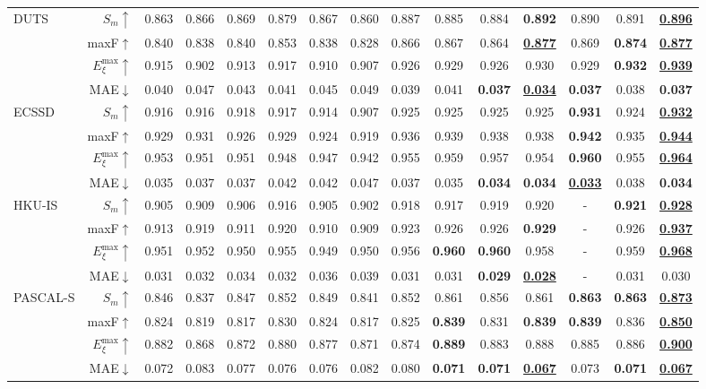 \documentclass[10pt,twocolumn,letterpaper]{article}
\def\blu#1{\textbf{\color{blue} #1}} \def\red#1{\textbf{\color{red}\underline{#1}}}
\begin{document}
\begin{table*}[t]
\begin{tabular}{lr|cccccccccccc|c}
  \multirow{4}{*}{DUTS}
    & $S_m\uparrow$  &0.863 &0.866 &0.869 &0.879 &0.867 &0.860 &0.887 &0.885 &0.884 &\blu{0.892} &0.890 &0.891 &\red{0.896} \\
    & maxF$\uparrow$ &0.840 &0.838 &0.840 &0.853 &0.838 &0.828 &0.866 &0.867 &0.864 &\red{0.877} &0.869 &\blu{0.874} &\red{0.877}\\
    & $E_{\xi}^{\text{max}}\uparrow$ &0.915 &0.902 &0.913 &0.917 &0.910 &0.907 &0.926 &0.929 &0.926 &0.930 &0.929 &\blu{0.932} &\red{0.939}\\
  \cite{wang2017duts}& MAE$\downarrow$ &0.040 &0.047 &0.043 &0.041 &0.045 &0.049 &0.039 &0.041 &\blu{0.037} &\red{0.034} &\blu{0.037} &0.038 &\blu{0.037}\\
     \hline
  \multirow{4}{*}{ECSSD}
    & $S_m\uparrow$   &0.916 &0.916 &0.918 &0.917 &0.914 &0.907 &0.925 &0.925 &0.925 &0.925 &\blu{0.931} &0.924 &\red{0.932}\\
    & maxF$\uparrow$  &0.929 &0.931 &0.926 &0.929 &0.924 &0.919 &0.936 &0.939 &0.938 &0.938 &\blu{0.942} &0.935 &\red{0.944}\\
    & $E_{\xi}^{\text{max}}\uparrow$ &0.953 &0.951 &0.951 &0.948 &0.947 &0.942 &0.955 &0.959 &0.957 &0.954 &\blu{0.960} &0.955 &\red{0.964} \\
   \cite{yan2013ECSSD}& MAE$\downarrow$ &0.035 &0.037 &0.037 &0.042 &0.042 &0.047 &0.037 &0.035 &\blu{0.034} &\blu{0.034} &\red{0.033} &0.038 &\blu{0.034}\\
     \hline
  \multirow{4}{*}{HKU-IS}
    & $S_m\uparrow$  &0.905 &0.909 &0.906 &0.916 &0.905 &0.902 &0.918 &0.917 &0.919 &0.920 &- &\blu{0.921} &\red{0.928} \\
    & maxF$\uparrow$ &0.913 &0.919 &0.911 &0.920 &0.910 &0.909 &0.923 &0.926 &0.926 &\blu{0.929} &- &0.926 &\red{0.937} \\
    & $E_{\xi}^{\text{max}}\uparrow$ &0.951 &0.952 &0.950 &0.955 &0.949 &0.950 &0.956 &\blu{0.960} &\blu{0.960} &0.958 &- &0.959 &\red{0.968}\\
     \cite{li2015HKUIS}& MAE$\downarrow$ &0.031 &0.032 &0.034 &0.032 &0.036 &0.039 &0.031 &0.031 &\blu{0.029} &\red{0.028} &- &0.031 &0.030\\
     \hline
  \multirow{4}{*}{PASCAL-S}
    & $S_m\uparrow$   &0.846 &0.837 &0.847 &0.852 &0.849 &0.841 &0.852 &0.861 &0.856 &0.861 &\blu{0.863} &\blu{0.863} &\red{0.873}\\
    & maxF$\uparrow$  &0.824 &0.819 &0.817 &0.830 &0.824 &0.817 &0.825 &\blu{0.839} &0.831 &\blu{0.839} &\blu{0.839} &0.836 &\red{0.850}\\
    & $E_{\xi}^{\text{max}}\uparrow$  &0.882 &0.868 &0.872 &0.880 &0.877 &0.871 &0.874 &\blu{0.889} &0.883 &0.888 &0.885 &0.886 &\red{0.900} \\
    \cite{li2014PASCALS}& MAE$\downarrow$ &0.072 &0.083 &0.077 &0.076 &0.076 &0.082 &0.080 &\blu{0.071} &\blu{0.071} &\red{0.067} &0.073 &\blu{0.071} &\red{0.067}\\
     \hline


\end{tabular}
\end{table*}
\end{document}
